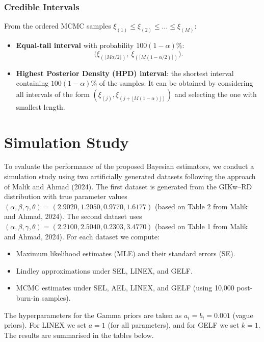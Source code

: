 \documentclass[12pt]{article}
\begin{document}
\subsubsection{Credible Intervals}



From the ordered MCMC samples \(\xi_{(1)} \le \xi_{(2)} \le \dots \le \xi_{(M)}\):



\begin{itemize}
    \item \textbf{Equal-tail interval} with probability \(100(1-\alpha)\%\):
    \[
    \bigl( \xi_{(\lfloor M\alpha/2\rfloor)},\ \xi_{(\lceil M(1-\alpha/2)\rceil)} \bigr).
    \]
    \item \textbf{Highest Posterior Density (HPD) interval}: the shortest interval
    containing \(100(1-\alpha)\%\) of the samples. It can be obtained by considering
    all intervals of the form \((\xi_{(j)},\xi_{(j+\lfloor M(1-\alpha)\rfloor)})\) and
    selecting the one with smallest length.
\end{itemize}



\section{Simulation Study}



To evaluate the performance of the proposed Bayesian estimators, we conduct a
simulation study using two artificially generated datasets following the approach
of Malik and Ahmad (2024). The first dataset is generated from the GIKw–RD
distribution with true parameter values \((\alpha, \beta, \gamma, \theta) =
(2.9020, 1.2050, 0.9770, 1.6177)\) (based on Table 2 from Malik and Ahmad, 2024).
The second dataset uses \((\alpha, \beta, \gamma, \theta) = (2.2100, 2.5040,
0.2303, 3.4770)\) (based on Table 1 from Malik and Ahmad, 2024). For each dataset
we compute:
\begin{itemize}
    \item Maximum likelihood estimates (MLE) and their standard errors (SE).
    \item Lindley approximations under SEL, LINEX, and GELF.
    \item MCMC estimates under SEL, AEL, LINEX, and GELF (using 10,000 post-burn-in samples).
\end{itemize}
The hyperparameters for the Gamma priors are taken as \(a_i = b_i = 0.001\) (vague priors).
For LINEX we set \(a = 1\) (for all parameters), and for GELF we set \(k = 1\).
The results are summarised in the tables below.
\end{document}

